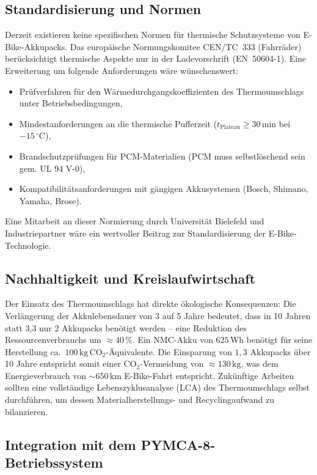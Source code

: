 ﻿\documentclass[a4paper,12pt]{article}
\theoremstyle{definition}
\begin{document}
\subsection{Standardisierung und Normen}

Derzeit existieren keine spezifischen Normen f\"ur thermische Schutzsysteme von E-Bike-Akkupacks. Das europ\"aische Normungskomitee CEN/TC~333 (Fahrr\"ader) ber\"ucksichtigt thermische Aspekte nur in der Ladevorschrift (EN~50604-1). Eine Erweiterung um folgende Anforderungen w\"are w\"unschenswert:
\begin{itemize}
  \item Pr\"ufverfahren f\"ur den W\"armedurchgangskoeffizienten des Thermoumschlags unter Betriebsbedingungen,
  \item Mindestanforderungen an die thermische Pufferzeit ($t_\mathrm{Plateau} \geq 30\,\mathrm{min}$ bei $-15\,{}^\circ\mathrm{C}$),
  \item Brandschutzpr\"ufungen f\"ur PCM-Materialien (PCM muss selbstl\"oschend sein gem. UL 94 V-0),
  \item Kompatibilit\"atsanforderungen mit g\"angigen Akkusystemen (Bosch, Shimano, Yamaha, Brose).
\end{itemize}
Eine Mitarbeit an dieser Normierung durch Universit\"at Bielefeld und Industriepartner w\"are ein wertvoller Beitrag zur Standardisierung der E-Bike-Technologie.

\subsection{Nachhaltigkeit und Kreislaufwirtschaft}

Der Einsatz des Thermoumschlags hat direkte \"okologische Konsequenzen: Die Verl\"anger\-ung der Akkulebensdauer von 3 auf 5 Jahre bedeutet, dass in 10 Jahren statt 3{,}3 nur 2 Akkupacks ben\"otigt werden -- eine Reduktion des Ressourcenverbrauchs um $\approx 40\,\%$. Ein NMC-Akku von $625\,\mathrm{Wh}$ ben\"otigt f\"ur seine Herstellung ca.\ $100\,\mathrm{kg}\,\mathrm{CO}_2$-\"Aquivalente. Die Einsparung von $1{,}3$ Akkupacks \"uber 10 Jahre entspricht somit einer $\mathrm{CO}_2$-Vermeidung von $\approx 130\,\mathrm{kg}$, was dem Energieverbrauch von $\sim 650\,\mathrm{km}$ E-Bike-Fahrt entspricht. Zuk\"unftige Arbeiten sollten eine vollst\"andige Lebenszyklusanalyse (LCA) des Thermoumschlags selbst durchf\"uhren, um dessen Materialherstellungs- und Recyclingaufwand zu bilanzieren.

\subsection{Integration mit dem PYMCA-8-Betriebssystem}
\end{document}
